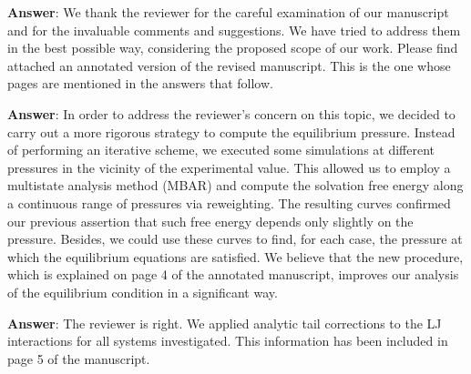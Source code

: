 \documentclass[]{article}
\begin{document}
\textbf{Answer}: We thank the reviewer for the careful examination of our manuscript and for the invaluable comments and suggestions.
We have tried to address them in the best possible way, considering the proposed scope of our work.
Please find attached an annotated version of the revised manuscript.
This is the one whose pages are mentioned in the answers that follow.

{\color{blue}{1) The authors chose not to use an iterative scheme to correct the pressure of their simulations. They should justify their choice by including quantitative information from their simulations on how this correction would affect both the differences in the free energy but also the system's density at high concentrations.}}

\textbf{Answer}:
In order to address the reviewer's concern on this topic, we decided to carry out a more rigorous strategy to compute the equilibrium pressure.
Instead of performing an iterative scheme, we executed some simulations at different pressures in the vicinity of the experimental value.
This allowed us to employ a multistate analysis method (MBAR) and compute the solvation free energy along a continuous range of pressures via reweighting.
The resulting curves confirmed our previous assertion that such free energy depends only slightly on the pressure.
Besides, we could use these curves to find, for each case, the pressure at which the equilibrium equations are satisfied.
We believe that the new procedure, which is explained on page 4 of the annotated manuscript, improves our analysis of the equilibrium condition in a significant way.

{\color{blue}{2) Among the various existing models used in this work, some explicitly report the use of LJ long range corrections in the energy and pressure. The authors should clearly state if they have taken that into account in their simulations.}}

\textbf{Answer}: The reviewer is right. We applied analytic tail corrections to the LJ interactions for all systems investigated. This information has been included in page 5 of the manuscript.

{}
\end{document}
